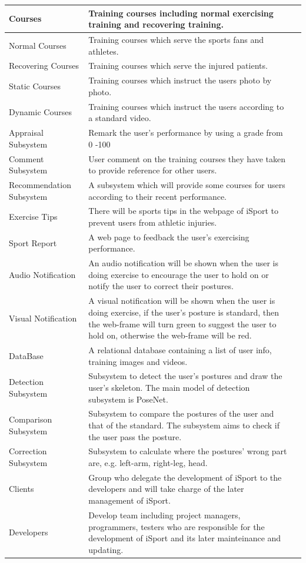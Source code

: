 \documentclass[16pt]{scrreprt}
\begin{document}
\begin{longtable}{|p{1.9in}|p{4in}|c|}
Courses & Training courses including normal exercising training and recovering training.\\ \hline
Normal Courses & Training courses which serve the sports fans and athletes.\\ \hline
Recovering Courses & Training courses which serve the injured patients.\\ \hline
Static Courses & Training courses which instruct the users photo by photo.\\ \hline
Dynamic Courses & Training courses which instruct the users according to a standard video.\\ \hline
Appraisal Subsystem & Remark the user's performance by using a grade from 0 -100\\ \hline
Comment Subsystem & User comment on the training courses they have taken to provide reference for other users.\\ 
\hline 
Recommendation Subsystem & A subsystem which will provide some courses for users according to their recent performance.\\ 
\hline
Exercise Tips & There will be sports tips in the webpage of iSport to prevent users from athletic injuries.\\ 
\hline 
Sport Report & A web page to feedback the user's exercising performance.\\ 
\hline 
Audio Notification & An audio notification will be shown when the user is doing exercise to encourage the user to hold on or notify the user to correct their postures.\\ 
\hline 
Visual Notification & A visual notification will be shown when the user is doing exercise, if the user's posture is standard, then the web-frame will turn green to suggest the user to hold on, otherwise the web-frame will be red.\\ 
\hline 
DataBase & A relational database containing a list of user info, training images and videos.\\ 
\hline 
Detection Subsystem & Subsystem to detect the user's postures and draw the user's skeleton. The main model of detection subsystem is PoseNet.\\ 
\hline 
Comparison Subsystem & Subsystem to compare the postures of the user and that of the standard. The subsystem aims to check if the user pass the posture.\\ 
\hline 
Correction Subsystem & Subsystem to calculate where the postures' wrong part are, e.g. left-arm, right-leg, head.\\ 
\hline 
Clients & Group who delegate the development of iSport to the developers and will take charge of the later management of iSport.\\ \hline
Developers & Develop team including project managers, programmers, testers who are responsible for the development of iSport and its later mainteinance and updating.\\ 
\hline 
\end{longtable}
\end{document}
